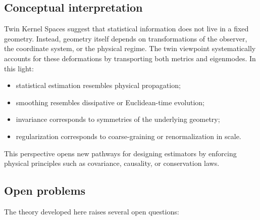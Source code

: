 \documentclass[11pt]{article}
\theoremstyle{definition}
\begin{document}
\subsection*{Conceptual interpretation}

Twin Kernel Spaces suggest that statistical information does not live in a fixed geometry.
Instead, geometry itself depends on transformations of the observer, the coordinate system, or the physical regime.
The twin viewpoint systematically accounts for these deformations by transporting both metrics and eigenmodes.
In this light:

\begin{itemize}[itemsep=2pt]
	\item statistical estimation resembles physical propagation;
	\item smoothing resembles dissipative or Euclidean-time evolution;
	\item invariance corresponds to symmetries of the underlying geometry;
	\item regularization corresponds to coarse-graining or renormalization in scale.
\end{itemize}

This perspective opens new pathways for designing estimators by enforcing physical principles such as covariance, causality, or conservation laws.

\subsection*{Open problems}

The theory developed here raises several open questions:
\end{document}
